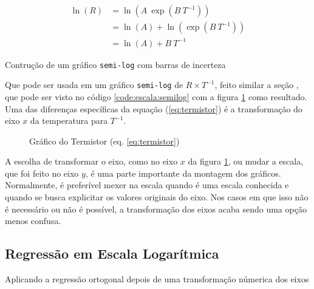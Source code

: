     \begin{align*}
        \ln(R)
            &= \ln\left(A ~ \exp\left(B ~ T^{-1}\right) \right) \\
            &= \ln(A) + \ln\left(\exp\left(B ~ T^{-1}\right) \right) \\
            &= \ln(A) + B ~ T^{-1}
    \end{align*}

    \begin{listing}[H]
        \caption{Contrução de um gráfico \texttt{semi-log} com barras de incerteza}
        \label{code:escala:semilog}

    \end{listing}

    Que pode ser usada em um gráfico \texttt{semi-log} de $R \times T^{-1}$, feito similar a seção , que pode ser visto no código \ref{code:escala:semilog} com a figura \ref{fig:escala:semilog:resultado} como resultado. Uma das diferenças específicas da equação (\ref{eq:termistor}) é a transformação do eixo $x$ da temperatura para $T^{-1}$.

    \begin{figure}[H]
        \centering
        

        \caption{Gráfico do Termistor (eq. \ref{eq:termistor})}
        \label{fig:escala:semilog:resultado}
    \end{figure}

    \begin{nota}
        A escolha de transformar o eixo, como no eixo $x$ da figura \ref{fig:escala:semilog:resultado}, ou mudar a escala, que foi feito no eixo $y$, é uma parte importante da montagem dos gráficos. Normalmente, é preferível mexer na escala quando é uma escala conhecida e quando se busca explicitar os valores originais do eixo. Nos casos em que isso não é necessário ou não é possível, a transformação dos eixos acaba sendo uma opção menos confusa.
    \end{nota}


\subsection{Regressão em Escala Logarítmica}

    \begin{listing}[H]
        \caption{Aplicando a regressão ortogonal depois de uma transformação númerica dos eixos}
        \label{code:escala:regres}

    \end{listing}

